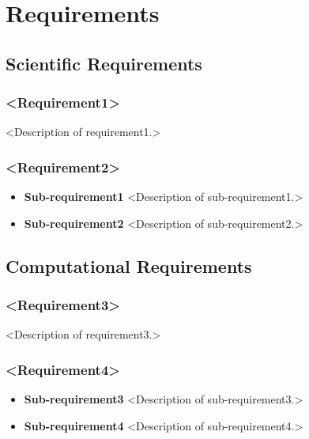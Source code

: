 
\section{Requirements}

\subsection{Scientific Requirements}


\subsubsection{<Requirement1>}
<Description of requirement1.>

\subsubsection{<Requirement2>}
\begin{itemize}
\item {\bf Sub-requirement1} 
<Description of sub-requirement1.>
\item {\bf Sub-requirement2} 
<Description of sub-requirement2.>
\end{itemize}

\subsection{Computational Requirements}

\subsubsection{<Requirement3>}
<Description of requirement3.>

\subsubsection{<Requirement4>}
\begin{itemize}
\item {\bf Sub-requirement3} 
<Description of sub-requirement3.>
\item {\bf Sub-requirement4} 
<Description of sub-requirement4.>
\end{itemize}





